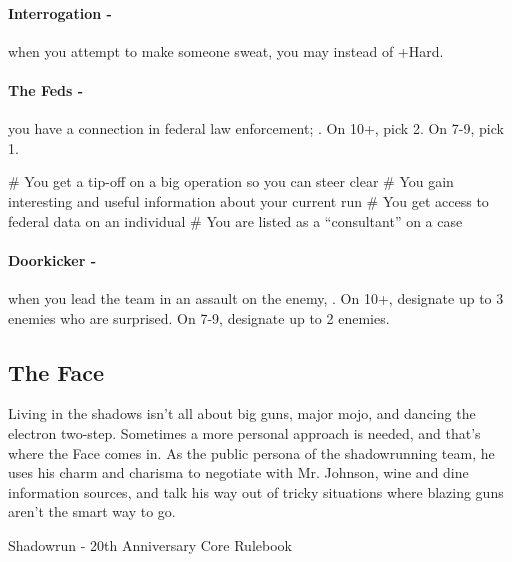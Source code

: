 \paragraph{Interrogation -} when you attempt to make someone sweat, you may  instead of +Hard.

\paragraph{The Feds -} you have a connection in federal law enforcement; . On 10+, pick 2. On 7-9, pick 1.
    \begin{easylist}
        # You get a tip-off on a big operation so you can steer clear
        # You gain interesting and useful information about your current run
        # You get access to federal data on an individual
        # You are listed as a “consultant” on a case        
    \end{easylist}

\paragraph{Doorkicker -} when you lead the team in an assault on the enemy, . On 10+, designate up to 3 enemies who are surprised. On 7-9, designate up to 2 enemies.



\clearpage
\subsection{The Face}
\epigraph{Living in the shadows isn’t all about big guns, major mojo, and dancing the electron two-step. Sometimes a more personal approach is needed, and that’s where the Face comes in. As the public persona of the shadowrunning team, he uses his charm and charisma to negotiate with Mr. Johnson, wine and dine information sources, and talk his way out of tricky situations where blazing guns aren’t the smart way to go.}{Shadowrun - 20th Anniversary Core Rulebook}

